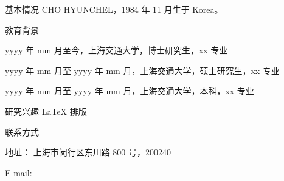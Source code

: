 \begin{resume}
  \begin{resumesection}{基本情况}
    CHO HYUNCHEL，1984 年 11 月生于 Korea。
  \end{resumesection}

  \begin{resumelist}{教育背景}
    \item yyyy 年 mm 月至今，上海交通大学，博士研究生，xx 专业
    \item yyyy 年 mm 月至 yyyy 年 mm 月，上海交通大学，硕士研究生，xx 专业
    \item yyyy 年 mm 月至 yyyy 年 mm 月，上海交通大学，本科，xx 专业
  \end{resumelist}

  \begin{resumesection}{研究兴趣}
    \LaTeX{} 排版
  \end{resumesection}

  \begin{resumelist}{联系方式}
    \item 地址： 上海市闵行区东川路 800 号，200240
    \item E-mail: 
  \end{resumelist}
\end{resume}
